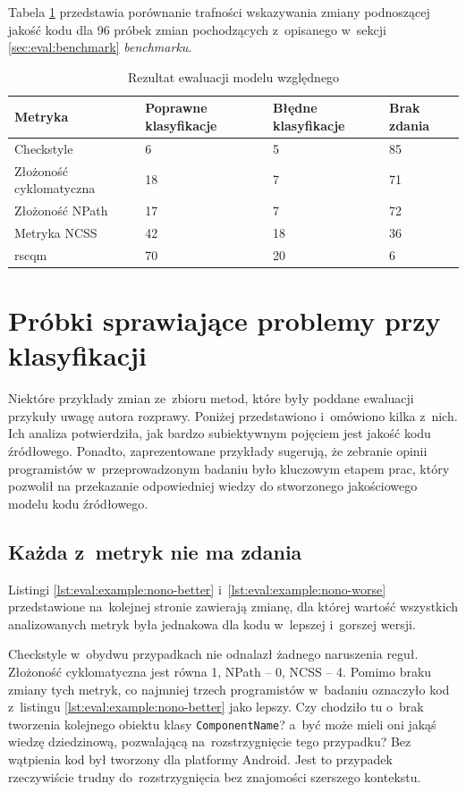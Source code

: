 \documentclass[twoside]{praca}
\begin{document}
Tabela \ref{tbl:eval:rscqm} przedstawia porównanie trafności wskazywania zmiany podnoszącej jakość kodu dla 96 próbek zmian pochodzących z~opisanego w~sekcji \ref{sec:eval:benchmark} \textit{benchmarku}.

\begin{table}[h]
\centering
\caption{Rezultat ewaluacji modelu względnego}
\label{tbl:eval:rscqm}
\begin{tabular}{|p{}|p{}|p{}|p{}|}
  \hline 
  \textbf{Metryka} & \textbf{Poprawne klasyfikacje} & \textbf{Błędne \hphantom{2mm} klasyfikacje} & \textbf{Brak zdania} \\ \hline
  Checkstyle & 6 & 5 & 85 \\ \hline
  Złożoność cyklomatyczna & 18 & 7 & 71 \\ \hline
  Złożoność NPath & 17 & 7 & 72 \\ \hline
  Metryka NCSS & 42 & 18 & 36 \\ \hline
  \gls{rscqm} & \cellcolor{green!25}70 & 20 & 6 \\ \hline
\end{tabular} 
\end{table}

\section{Próbki sprawiające problemy przy klasyfikacji}

Niektóre przykłady zmian ze~zbioru metod, które były poddane ewaluacji przykuły uwagę autora rozprawy. Poniżej przedstawiono i~omówiono kilka z~nich. Ich analiza potwierdziła, jak bardzo subiektywnym pojęciem jest jakość kodu źródłowego. Ponadto, zaprezentowane przykłady sugerują, że zebranie opinii programistów w~przeprowadzonym badaniu było kluczowym etapem prac, który pozwolił na przekazanie odpowiedniej wiedzy do stworzonego jakościowego modelu kodu źródłowego.

\subsection{Każda z~metryk nie ma zdania}

Listingi \ref{lst:eval:example:nono-better} i~\ref{lst:eval:example:nono-worse} przedstawione na~kolejnej stronie zawierają zmianę, dla której wartość wszystkich analizowanych metryk była jednakowa dla kodu w~lepszej i~gorszej wersji.

Checkstyle w~obydwu przypadkach nie odnalazł żadnego naruszenia reguł. Złożoność cyklomatyczna jest równa 1, NPath -- 0, NCSS -- 4. Pomimo braku zmiany tych metryk, co najmniej trzech programistów w~badaniu oznaczyło kod z~listingu \ref{lst:eval:example:nono-better} jako lepszy. Czy chodziło tu o~brak tworzenia kolejnego obiektu klasy \texttt{ComponentName}? a~być może mieli oni jakąś wiedzę dziedzinową, pozwalającą na~rozstrzygnięcie tego przypadku? Bez wątpienia kod był tworzony dla platformy Android. Jest to przypadek rzeczywiście trudny do~rozstrzygnięcia bez znajomości szerszego kontekstu.
\end{document}
